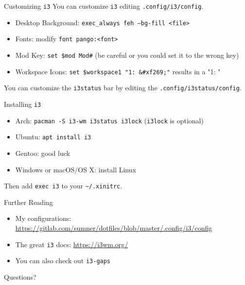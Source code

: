 \documentclass{lug}
\newcommand{\ithree}{\texttt{i3}\xspace}
\begin{document}
\begin{frame}{Customizing \ithree}
    You can customize \ithree editing \texttt{.config/i3/config}.
    \begin{itemize}
        \item Desktop Background: \texttt{exec\_always feh --bg-fill <file>}
        \item Fonts: modify \texttt{font pango:<font>}
        \item Mod Key: \texttt{set \$mod Mod\#} (be careful or you could set it
            to the wrong key)
        \item Workspace Icons: \texttt{set \$workspace1 "1: \&\#xf269;"} results
            in a "1: \faFirefox"
    \end{itemize}

    You can customize the \texttt{i3status} bar by editing the
    \texttt{.config/i3status/config}.
\end{frame}

\begin{frame}{Installing \ithree}
    \begin{itemize}
        \item Arch: \texttt{pacman -S i3-wm i3status i3lock} (\texttt{i3lock} is
            optional)
        \item Ubuntu: \texttt{apt install i3}
        \item Gentoo: good luck
        \item Windows or macOS/OS X: install Linux
    \end{itemize}

    Then add \texttt{exec i3} to your \texttt{\textasciitilde/.xinitrc}.
\end{frame}

\begin{frame}{Further Reading}
    \begin{itemize}
        \item My configurations: \url{https://gitlab.com/sumner/dotfiles/blob/master/.config/i3/config}
        \item The great \ithree docs: \url{https://i3wm.org/}
        \item You can also check out \texttt{i3-gaps}
    \end{itemize}
\end{frame}

\begin{frame}[standout]
    \Huge
    Questions?
\end{frame}
\end{document}
